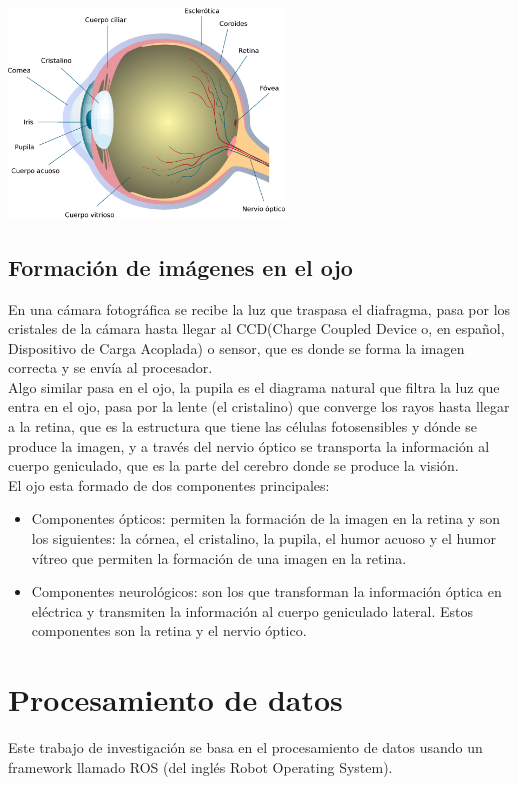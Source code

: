 ~\cite{joseramon2005}
\begin{center}
    \includegraphics[width=0.55\textwidth]{Capitulo2/Fig1_2.eps}       
    \label{Fig1_2}
\end{center}

\subsection{Formación de imágenes en el ojo}
En una cámara fotográfica se recibe la luz que traspasa el diafragma, pasa por los 
cristales de la cámara hasta llegar al CCD(Charge Coupled Device o, en español, 
Dispositivo de Carga Acoplada) o sensor, que es donde se forma la imagen correcta y se 
envía al procesador.\\
Algo similar pasa en el ojo, la pupila es el diagrama natural que filtra la luz que 
entra en el ojo, pasa por la lente (el cristalino)  que converge los rayos hasta 
llegar a la retina, que es la estructura que tiene las células fotosensibles y dónde 
se produce la imagen, y a través del nervio óptico se transporta la información al 
cuerpo geniculado, que es la parte del cerebro donde se produce la visión.\\
El ojo esta formado de dos componentes principales:
\begin{itemize}
\item Componentes ópticos: permiten la formación de la imagen en la retina y son los 
siguientes: la córnea, el cristalino, la pupila, el humor acuoso y el humor vítreo que 
permiten la formación de una imagen en la retina.
\item Componentes neurológicos: son los que transforman la información óptica en 
eléctrica y transmiten la información al cuerpo geniculado lateral. Estos componentes 
son la retina y el nervio óptico.
\end{itemize}

\section{Procesamiento de datos}
Este trabajo de investigación se basa en el procesamiento de datos usando un framework
llamado ROS (del inglés Robot Operating System).

